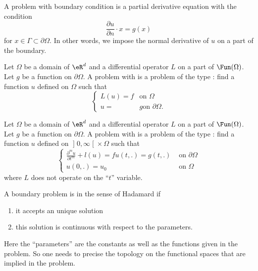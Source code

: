 \begin{definition}
    A problem with  boundary condition is a partial derivative equation with the condition
    \begin{equation}
        \frac{ \partial u }{ \partial n }\cdot x=g(x)
    \end{equation}
    for \( x\in\Gamma\subset\partial\Omega\). In other words, we impose the normal derivative of \( u\) on a part of the boundary.
\end{definition}

\begin{definition}
    Let \( \Omega\) be a domain of \( \eR^d\) and a differential operator \( L\) on a part of \( \Fun(\Omega)\). Let \( g\) be a function on \( \partial \Omega\). A problem with  is a problem of the type : find a function \( u\) defined on \( \Omega\) such that
    \begin{equation}
        \begin{cases}
            L(u)=f    &   \text{on } \Omega\\
            u =   & g   \text{on }\partial\Omega.
        \end{cases}
    \end{equation}
\end{definition}

\begin{definition}
Let \( \Omega\) be a domain of \( \eR^d\) and a differential operator \( L\) on a part of \( \Fun(\Omega)\). Let \( g\) be a function on \( \partial \Omega\). A problem with  is a problem of the type : find a function \( u\) defined on \( \mathopen] 0 , \infty \mathclose[\times \Omega\) such that
    \begin{equation}
        \begin{cases}
            \frac{ \partial^mu }{ \partial t^m }+l(u)=f
            u(t,.)=g(t,.)&\text{ on }\partial\Omega\\
            u(0,.)=u_0&\text{ on }\Omega
        \end{cases}
    \end{equation}
    where \( L\) does not operate on the ``\( t\)'' variable.
\end{definition}

\begin{definition}
    A boundary problem is  in the sense of Hadamard if
    \begin{enumerate}
        \item
            it accepts an unique solution
        \item
            this solution is continuous with respect to the parameters.
    \end{enumerate}
    Here the ``parameters'' are the constants as well as the functions given in the problem. So one needs to precise the topology on the functional spaces that are implied in the problem.
\end{definition}

